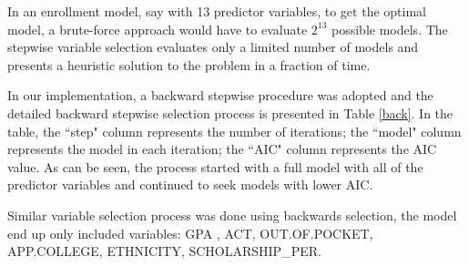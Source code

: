 \documentclass[12pt,english]{report}
\begin{document}
In an enrollment model, say with 13 predictor variables, to get the optimal
model, a brute-force approach would have to evaluate $2^{13}$ possible models.
The stepwise variable selection evaluates only a limited number of models and
presents a heuristic solution to the problem in a fraction of time.

In our implementation, a backward stepwise procedure was adopted and the
detailed backward stepwise selection process is presented in Table \ref{back}.
In the table, the ``step" column represents the number of iterations; the
``model" column represents the model in each iteration; the ``AIC" column
represents the AIC value.  As can be seen, the process started with a full
model with all of the predictor variables and continued to seek models with
lower AIC.


Similar variable selection process was done using backwards selection, the
model end up only included variables: GPA , ACT, OUT.OF.POCKET,  APP.COLLEGE,
ETHNICITY, SCHOLARSHIP\_PER. 


\end{document}
